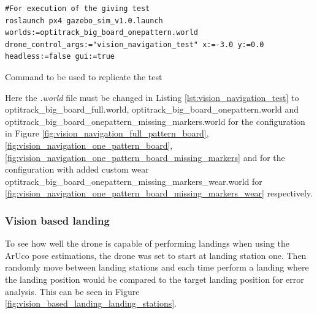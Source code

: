 \documentclass[../Head/report.tex]{subfiles}
\begin{document}
\begin{listing}[H] 
\begin{tcolorbox}[
    enhanced,
    attach boxed title to top left={xshift=6mm,yshift=-3mm},
    colback=lightgreen!20,
    colframe=lightgreen,
    fonttitle=\bfseries\color{black},
]
\begin{verbatim}
#For execution of the giving test
roslaunch px4 gazebo_sim_v1.0.launch worlds:=optitrack_big_board_onepattern.world drone_control_args:="vision_navigation_test" x:=-3.0 y:=0.0 headless:=false gui:=true
\end{verbatim}
\end{tcolorbox}
\caption{Command to be used to replicate the test}
\label{lst:vision_navigation_test}    
\end{listing} 

Here the \textit{.world} file must be changed in Listing \ref{lst:vision_navigation_test} to optitrack\_big\_board\_full.world, optitrack\_big\_board\_onepattern.world and optitrack\_big\_board\_onepattern\_missing\_markers.world for the configuration in Figure \ref{fig:vision_navigation_full_pattern_board}, \ref{fig:vision_navigation_one_pattern_board}, \ref{fig:vision_navigation_one_pattern_board_missing_markers} and for the configuration with added custom wear optitrack\_big\_board\_onepattern\_missing\_markers\_wear.world  for  \ref{fig:vision_navigation_one_pattern_board_missing_markers_wear} respectively. 

\subsubsection{Vision based landing}
\label{sec:vision_based_landing}

To see how well the drone is capable of performing landings when using the ArUco pose estimations, the drone was set to start at landing station one. Then randomly move between landing stations and each time perform a landing where the landing position would be compared to the target landing position for error analysis. This can be seen in Figure \ref{fig:vision_based_landing_landing_stations}.  
\end{document}
